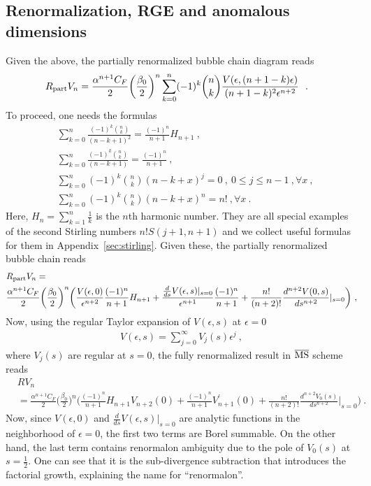 \documentclass[a4paper,11pt]{article}
\begin{document}
\subsection{Renormalization, RGE and anomalous dimensions}
Given the above, the partially renormalized bubble chain diagram reads
\begin{align}
&R_{\rm part}V_n=\frac{\alpha^{n+1}C_F}{2}\bigg(\frac{\beta_0}{2}\bigg)^n\sum_{k=0}^n(-1)^k\binom{n}{k}\frac{V(\epsilon,(n+1-k)\epsilon)}{(n+1-k)^2\epsilon^{n+2}} \  \ .
\end{align}
To proceed, one needs the formulas~\cite{Palanques-Mestre:1983ogz,Beneke:1994sw,Beneke:1995pq}
\begin{align}
   & \sum_{k=0}^n\frac{(-1)^k\binom{n}{k}}{(n-k+1)^2}=\frac{(-1)^n}{n+1}H_{n+1}  \ , \\
   & \sum_{k=0}^n\frac{(-1)^k\binom{n}{k}}{(n-k+1)}=\frac{(-1)^n}{n+1} \ , \\
   & \sum_{k=0}^{n}(-1)^k \binom{n}{k}(n-k+x)^j=0  \ , \  0\le j\le n-1  \ , \forall x \ , \label{eq:S(n,j)}\\ 
& \sum_{k=0}^n(-1)^k\binom{n}{k}(n-k+x)^n=n! \label{eq:S(n,n)} \ , \forall x \ .
\end{align}
Here, $H_n=\sum_{k=1}^n\frac{1}{k}$ is the $n$th harmonic number. 
They are all special examples of the second Stirling numbers $n!S(j+1,n+1)$ and we collect useful formulas for them in Appendix~\ref{sec:stirling}. 
Given these, the partially renormalized bubble chain reads
\begin{align}
&R_{\rm part}V_n=\nonumber \\
&\frac{\alpha^{n+1}C_F}{2}\bigg(\frac{\beta_0}{2}\bigg)^n\bigg(\frac{V(\epsilon,0)}{\epsilon^{n+2}}\frac{(-1)^n}{n+1}H_{n+1}+\frac{\frac{d}{ds}V(\epsilon,s)|_{s=0}}{\epsilon^{n+1}} \frac{(-1)^n}{n+1}+\frac{n!}{(n+2)!}\frac{d^{n+2}V(0,s)}{ds^{n+2}}|_{s=0} \bigg)\ ,
\end{align}
Now, using the regular Taylor expansion of $V(\epsilon,s)$ at $\epsilon=0$ 
\begin{align}
V(\epsilon,s)=\sum_{j=0}^{\infty}V_j(s)\epsilon^j \ ,
\end{align}
where $V_j(s)$ are regular at $s=0$, the fully renormalized result in $\overline{\rm MS}$ scheme reads 
\begin{align}\label{eq:Vnfull}
&RV_n\nonumber \\ 
&=\frac{\alpha^{n+1}C_F}{2}\bigg(\frac{\beta_0}{2}\bigg)^n\bigg(\frac{(-1)^n}{n+1}H_{n+1}V_{n+2}(0)+\frac{(-1)^n}{n+1}V_{n+1}^{\prime}(0)+\frac{n!}{(n+2)!}\frac{d^{n+2}V_0(s)}{ds^{n+2}}|_{s=0} \bigg) \ .
\end{align}
Now, since $V(\epsilon,0)$ and $\frac{d}{ds}V(\epsilon,s)|_{s=0}$ are analytic functions in the neighborhood of $\epsilon=0$, the first two terms are Borel summable. On the other hand, the last term contains renormalon ambiguity due to the pole of $V_0(s)$ at $s=\frac{1}{2}$.  One can see that it is the sub-divergence subtraction that introduces the factorial growth, explaining the name for ``renormalon''. 
\end{document}
